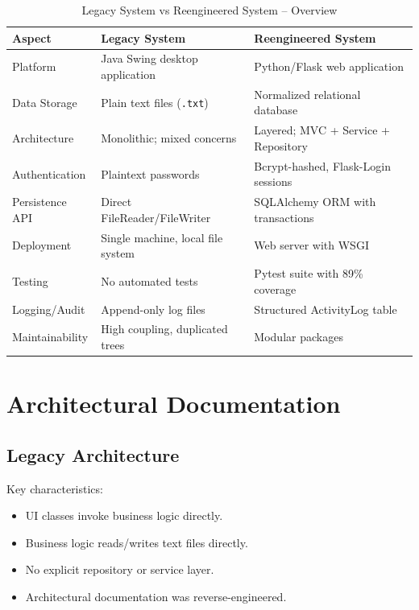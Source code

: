 \begin{table}[h]
  \centering
  \caption{Legacy System vs Reengineered System -- Overview}
  \begin{tabular}{p{3.2cm} p{5.2cm} p{5.2cm}}
    \toprule
    \textbf{Aspect} & \textbf{Legacy System} & \textbf{Reengineered System} \\
    \midrule
    Platform & Java Swing desktop application & Python/Flask web application \\
    Data Storage & Plain text files (\texttt{.txt}) & Normalized relational database \\
    Architecture & Monolithic; mixed concerns & Layered; MVC + Service + Repository \\
    Authentication & Plaintext passwords & Bcrypt-hashed, Flask-Login sessions \\
    Persistence API & Direct FileReader/FileWriter & SQLAlchemy ORM with transactions \\
    Deployment & Single machine, local file system & Web server with WSGI \\
    Testing & No automated tests & Pytest suite with 89\% coverage \\
    Logging/Audit & Append-only log files & Structured ActivityLog table \\
    Maintainability & High coupling, duplicated trees & Modular packages \\
    \bottomrule
  \end{tabular}
\end{table}

\section{Architectural Documentation}

\subsection{Legacy Architecture}

Key characteristics:
\begin{itemize}[leftmargin=1.2cm]
  \item UI classes invoke business logic directly.
  \item Business logic reads/writes text files directly.
  \item No explicit repository or service layer.
  \item Architectural documentation was reverse-engineered.
\end{itemize}

